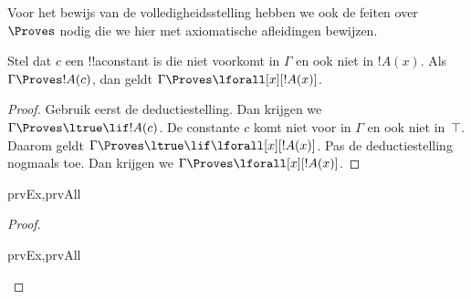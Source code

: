 \documentclass[../../../include/open-logic-section]{subfiles}
\begin{document}


\begin{explain}
  Voor het bewijs van de volledigheidsstelling hebben we ook de feiten
  over~$\Proves$ nodig die we hier met axiomatische afleidingen bewijzen.
\end{explain}

\begin{thm}
 Stel dat $c$ een !!a{constant} is die
niet voorkomt in $\Gamma$ en ook niet in $!A(x)$. Als
$\Gamma \Proves !A(c)$, dan geldt
$\Gamma \Proves \lforall[x][!A(x)]$.
\end{thm}

\begin{proof}
Gebruik eerst de deductiestelling. Dan krijgen we
$\Gamma \Proves \ltrue \lif !A(c)$. De constante $c$ komt niet voor
in $\Gamma$ en ook niet in~$\top$. Daarom geldt
$\Gamma \Proves \ltrue \lif \lforall[x][!A(x)]$. Pas de
deductiestelling nogmaals toe. Dan krijgen we
$\Gamma \Proves \lforall[x][!A(x)]$.
\end{proof}

\begin{prop}
\begin{tagenumerate}{prvEx,prvAll}

\end{tagenumerate}
\end{prop}

\begin{proof}
\begin{tagenumerate}{prvEx,prvAll}
\end{tagenumerate}
\end{proof}
\end{document}
